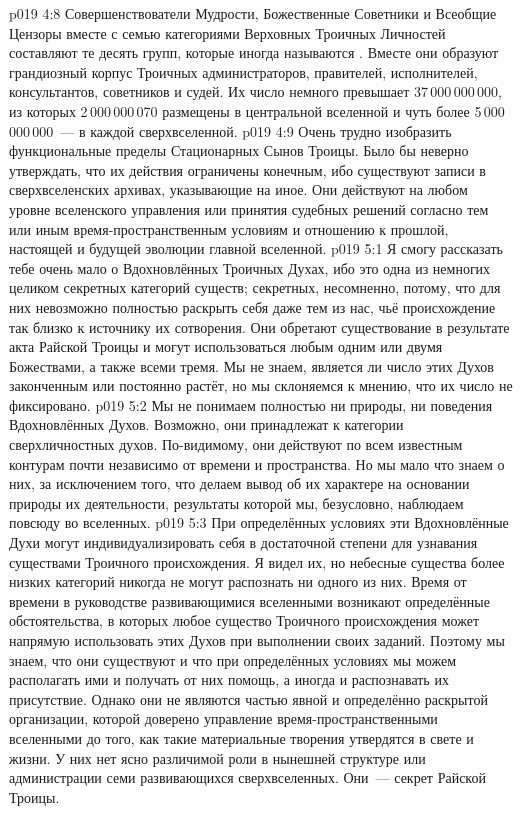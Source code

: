 \vs p019 4:8 \pc Совершенствователи Мудрости, Божественные Советники и Всеобщие Цензоры вместе с семью категориями Верховных Троичных Личностей составляют те десять групп, которые иногда называются . Вместе они образуют грандиозный корпус Троичных администраторов, правителей, исполнителей, консультантов, советников и судей. Их число немного превышает 37\,000\,000\,000, из которых 2\,000\,000\,070 размещены в центральной вселенной и чуть более 5\,000\,000\,000~--- в каждой сверхвселенной.
\vs p019 4:9 Очень трудно изобразить функциональные пределы Стационарных Сынов Троицы. Было бы неверно утверждать, что их действия ограничены конечным, ибо существуют записи в сверхвселенских архивах, указывающие на иное. Они действуют на любом уровне вселенского управления или принятия судебных решений согласно тем или иным время\hyp{}пространственным условиям и отношению к прошлой, настоящей и будущей эволюции главной вселенной.
\vs p019 5:1 Я смогу рассказать тебе очень мало о Вдохновлённых Троичных Духах, ибо это одна из немногих целиком секретных категорий существ; секретных, несомненно, потому, что для них невозможно полностью раскрыть себя даже тем из нас, чьё происхождение так близко к источнику их сотворения. Они обретают существование в результате акта Райской Троицы и могут использоваться любым одним или двумя Божествами, а также всеми тремя. Мы не знаем, является ли число этих Духов законченным или постоянно растёт, но мы склоняемся к мнению, что их число не фиксировано.
\vs p019 5:2 Мы не понимаем полностью ни природы, ни поведения Вдохновлённых Духов. Возможно, они принадлежат к категории сверхличностных духов. По\hyp{}видимому, они действуют по всем известным контурам почти независимо от времени и пространства. Но мы мало что знаем о них, за исключением того, что делаем вывод об их характере на основании природы их деятельности, результаты которой мы, безусловно, наблюдаем повсюду во вселенных.
\vs p019 5:3 При определённых условиях эти Вдохновлённые Духи могут индивидуализировать себя в достаточной степени для узнавания существами Троичного происхождения. Я видел их, но небесные существа более низких категорий никогда не могут распознать ни одного из них. Время от времени в руководстве развивающимися вселенными возникают определённые обстоятельства, в которых любое существо Троичного происхождения может напрямую использовать этих Духов при выполнении своих заданий. Поэтому мы знаем, что они существуют и что при определённых условиях мы можем располагать ими и получать от них помощь, а иногда и распознавать их присутствие. Однако они не являются частью явной и определённо раскрытой организации, которой доверено управление время\hyp{}пространственными вселенными до того, как такие материальные творения утвердятся в свете и жизни. У них нет ясно различимой роли в нынешней структуре или администрации семи развивающихся сверхвселенных. Они~--- секрет Райской Троицы.
